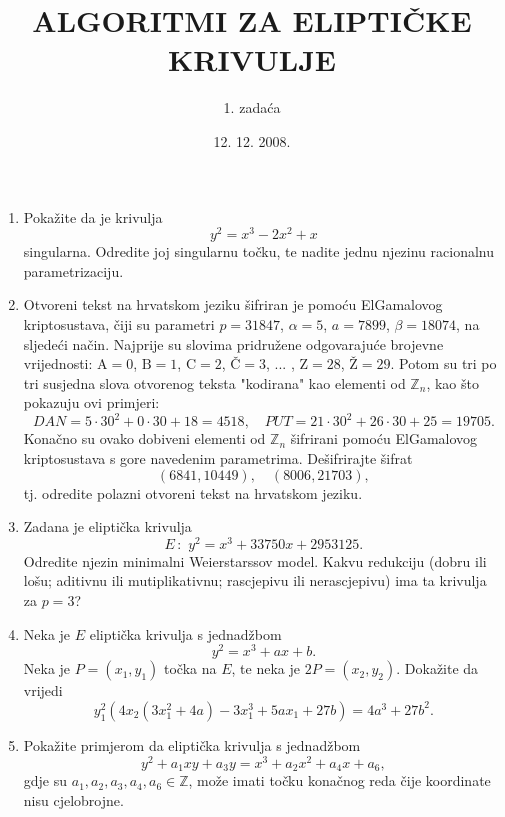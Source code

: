 \documentclass[10pt]{article}
\title{ALGORITMI ZA ELIPTI\v{C}KE KRIVULJE}
\author{\Large 1. zada\'ca}
\date{ 12. 12. 2008. }
\def \dj {\hbox
         {\rlap{\kern 0.2em\raise 1.30ex\hbox
         {\vrule height 0.09ex width 0.33em}}d}}
\begin{document}
\maketitle
\thispagestyle{empty}

\begin{enumerate}

\item Poka\v{z}ite da je krivulja
$$ y^2 = x^3 - 2x^2 + x $$
singularna. Odredite joj singularnu to\v{c}ku, te na\dj{}ite jednu
njezinu racionalnu parametrizaciju.

\item Otvoreni tekst na hrvatskom jeziku \v{s}ifriran je
      pomo\'cu ElGamalovog kriptosustava, \v{c}iji su parametri $p=31847$,
      $\alpha =5$, $a=7899$, $\beta=18074$, na sljede\'ci na\v{c}in.
      Naj\-prije su slovima pridru\v{z}ene odgovaraju\'ce brojevne
      vrijednosti: $\mbox{A}=0$, $\mbox{B}=1$, $\mbox{C}=2$, $\mbox{\v{C}}=3$, ... ,
      $\mbox{Z}=28$, $\mbox{\v{Z}}=29$. Potom su tri po tri susjedna slova
      otvorenog teksta "kodirana" kao elementi od $\mathbb{Z}_n$,
      kao \v{s}to pokazuju ovi primjeri:
      $$ DAN= 5\cdot 30^2 + 0\cdot 30 + 18 = 4518, \quad
      PUT = 21\cdot 30^2 + 26\cdot 30 + 25 = 19705. $$
      Kona\v{c}no su ovako dobiveni elementi od
      $\mathbb{Z}_n$ \v{s}ifrirani pomo\'cu ElGamalovog kriptosustava
      s gore navedenim parametrima. De\v{s}ifrirajte \v{s}ifrat
      $$ (6841, 10449), \quad (8006, 21703),$$
      tj. odredite polazni otvoreni tekst na hrvatskom jeziku.


\item Zadana je elipti\v{c}ka krivulja
$$ E\,:\,\, y^2 = x^3 + 33750x+2953125. $$
Odredite njezin minimalni Weierstarssov model.
Kakvu redukciju (dobru ili lo\v{s}u; aditivnu ili mutiplikativnu; rascjepivu ili nerascjepivu)
ima ta krivulja za $p=3$?

\item Neka je $E$ elipti\v{c}ka krivulja s jednad\v{z}bom
$$ y^2 = x^3 + ax +b. $$
Neka je $P=(x_1,y_1)$ to\v{c}ka na $E$, te neka je $2P=(x_2,y_2)$.
Doka\v{z}ite da vrijedi
$$ y_1^2 (4x_2(3x_1^2+4a)-3x_1^3 + 5ax_1 + 27b) = 4a^3 + 27b^2. $$

\item Poka\v{z}ite primjerom da elipti\v{c}ka krivulja s jednad\v{z}bom
$$ y^2 + a_1xy + a_3 y= x^3 + a_2 x^2 + a_4 x + a_6, $$
gdje su $a_1,a_2,a_3,a_4,a_6 \in \mathbb{Z}$, mo\v{z}e imati
to\v{c}ku kona\v{c}nog reda \v{c}ije koordinate nisu cjelobrojne.



\end{enumerate}
\end{document}
